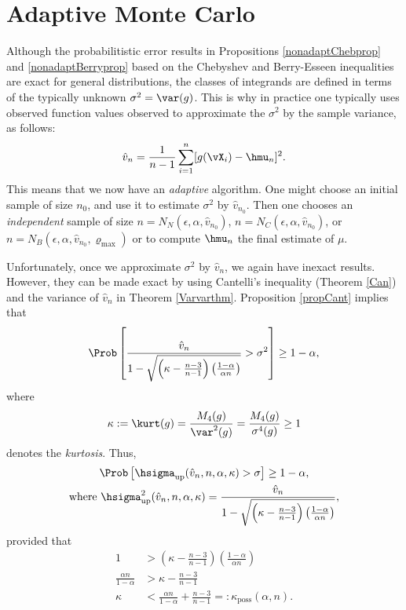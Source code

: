 \documentclass[12pt]{amsart}
\newcommand{\hv}{\hat{v}}
\begin{document}
\section{Adaptive Monte Carlo}
Although the probabilitistic error results in Propositions \ref{nonadaptChebprop} and \ref{nonadaptBerryprop} based on the Chebyshev and Berry-Esseen inequalities are exact for general distributions, the classes of integrands are defined in terms of the typically unknown $\sigma^2=\var(g)$.  This is why in practice one typically uses observed function values observed to approximate the $\sigma^2$ by the sample variance, as follows:
\begin{equation} \label{samplevar}
\hv_{n} = \frac 1{n-1} \sum_{i=1}^{n} [g(\vX_i)- \hmu_{n}]^2.
\end{equation}
This means that we now have an \emph{adaptive} algorithm.  One might choose an initial sample of size $n_0$, and use it to estimate $\sigma^2$ by $\hv_{n_0}$.  Then one chooses an \emph{independent} sample of size $n=N_{N}(\epsilon,\alpha,\hv_{n_0})$, $n=N_{C}(\epsilon,\alpha,\hv_{n_0})$, or  $n=N_{B}(\epsilon,\alpha,\hv_{n_0},\varrho_{\max})$ or to compute $\hmu_n$ the final estimate of $\mu$.

Unfortunately, once we approximate $\sigma^2$ by $\hv_n$, we again have inexact results.  However, they can be made exact by using Cantelli's inequality (Theorem \ref{Can}) and the variance of $\hv_n$ in Theorem \ref{Varvarthm}.  Proposition \ref{propCant} implies that
\[
\Prob\left[\frac{\hv_n}{1 - \sqrt{\left ( \kappa  - \frac{n-3}{n-1}\right)\left(\frac{1-\alpha}{\alpha n}\right)}} > \sigma^2 \right] \ge 1 - \alpha,
\]
where
\begin{equation} \label{kurtdef}
\kappa:= \kurt(g) = \frac{M_4(g)}{\var^2(g)} = \frac{M_4(g)}{\sigma^4(g)} \ge 1
\end{equation}
denotes the \emph{kurtosis}.  Thus,
\begin{subequations}\label{probvarupbd}
\begin{gather}
\Prob\left[\hsigma_{\text{up}}(\hv_n,n,\alpha,\kappa)  > \sigma \right] \ge 1 - \alpha, \\
\text{where } \hsigma^2_{\text{up}}(\hv_n,n,\alpha,\kappa) = \frac{\hv_{n}}{1 - \sqrt{ \left ( \kappa  - \frac{n-3}{n-1}\right)\left(\frac{1-\alpha}{\alpha n }\right)}},
\end{gather}
\end{subequations}
provided that
\begin{align*}
1 &> \left ( \kappa  - \frac{n-3}{n-1}\right)\left(\frac{1-\alpha}{ \alpha n}\right)\\
\frac{\alpha n }{1-\alpha} & > \kappa  - \frac{n-3}{n-1} \\
\kappa & < \frac{\alpha n}{1-\alpha} + \frac{n-3}{n-1} =: \kappa_{\text{poss}} (\alpha,n).
\end{align*}
\end{document}
